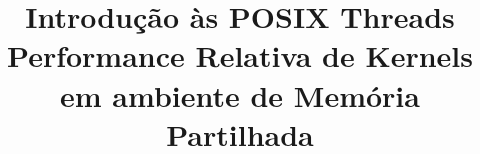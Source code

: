 \documentclass[conference,compsoc]{IEEEtran}
\begin{document}
%
\title{Introdução às POSIX Threads\\ Performance Relativa de Kernels em ambiente de Memória Partilhada}

\author{
}


% 




\end{document}
